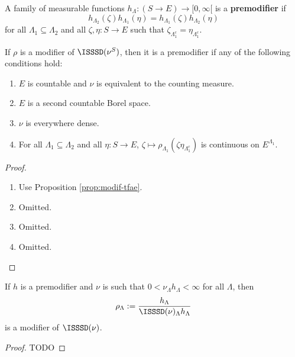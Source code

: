 \begin{definition}
    \label{def:premodif}
    \uses{}
    \leanok

    A family of measurable functions $h_\Lambda : (S \to E) \to [0, \infty[$ is a {\bf premodifier} if
    $$h_{\Lambda_2}(\zeta)h_{\Lambda_1}(\eta) = h_{\Lambda_1}(\zeta)h_{\Lambda_2}(\eta)$$
    for all $\Lambda_1 \subseteq \Lambda_2$ and all $\zeta, \eta : S \to E$ such that $\zeta_{\Lambda_1^c} = \eta_{\Lambda_1^c}$.
\end{definition}

\begin{lemma}
    \label{lem:modif-premodif}
    If $\rho$ is a modifier of $\ISSSD(\nu^S)$, then it is a premodifier if any of the following conditions hold:
    \begin{enumerate}
        \item $E$ is countable and $\nu$ is equivalent to the counting measure.
        \item $E$ is a second countable Borel space.
        \item $\nu$ is everywhere dense.
        \item For all $\Lambda_1 \subseteq \Lambda_2$ and all $\eta : S \to E$, $\zeta \mapsto \rho_{\Lambda_1}(\zeta \eta_{\Lambda_1^c})$ is continuous on $E^{\Lambda_1}$.
    \end{enumerate}
\end{lemma}
\begin{proof}

    \begin{enumerate}
        \item Use Proposition \ref{prop:modif-tfae}.
        \item Omitted.
        \item Omitted.
        \item Omitted.
    \end{enumerate}
\end{proof}

\begin{lemma}
    \label{lem:premodif-modif}
    \leanok
    If $h$ is a premodifier and $\nu$ is such that $0 < \nu_\Lambda h_\Lambda < \infty$ for all $\Lambda$, then
    $$\rho_\Lambda := \frac{h_\Lambda}{\ISSSD(\nu)_\Lambda h_\Lambda}$$
    is a modifier of $\ISSSD(\nu)$.
\end{lemma}
\begin{proof}

    TODO
\end{proof}


